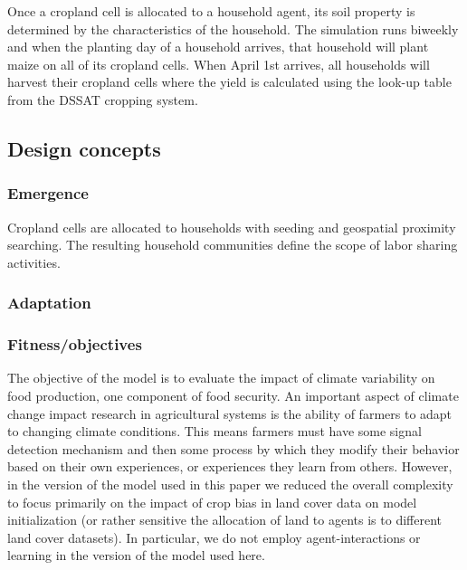 \documentclass[11pt, titlepage]{article}
\begin{document}
Once a cropland cell is allocated to a household agent, its soil property is determined by the characteristics of the household. The simulation runs biweekly and when the planting day of a household arrives, that household will plant maize on all of its cropland cells. When April 1st arrives, all households will harvest their cropland cells where the yield is calculated using the look-up table from the DSSAT cropping system.

\subsection{\large Design concepts}

\subsubsection{Emergence} 
Cropland cells are allocated to households with seeding and geospatial proximity searching. The resulting household communities define the scope of labor sharing activities.

\subsubsection{Adaptation}
% 
\subsubsection{Fitness/objectives} 
The objective of the model is to evaluate the impact of climate variability on food production, one component of food security. An important aspect of climate change impact research in agricultural systems is the ability of farmers to adapt to changing climate conditions. This means farmers must have some signal detection mechanism and then some process by which they modify their behavior based on their own experiences, or experiences they learn from others. However, in the version of the model used in this paper we reduced the overall complexity to focus primarily on the impact of crop bias in land cover data on model initialization (or rather sensitive the allocation of land to agents is to different land cover datasets). In particular, we do not employ agent-interactions or learning in the version of the model used here.  
\end{document}
